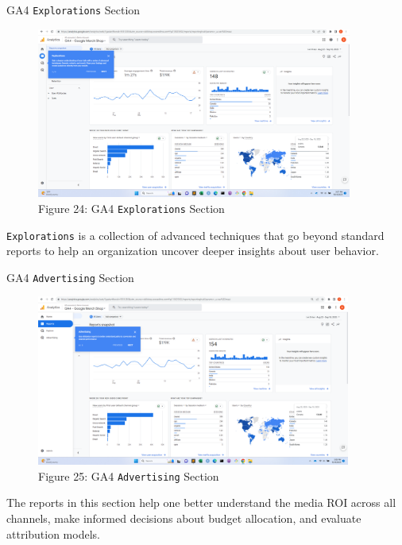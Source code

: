 \documentclass[pdf]{beamer}
\theoremstyle{remark}
\theoremstyle{definition}
\begin{document}
\begin{frame}[t]{GA4 \texttt{Explorations} Section}
\begin{figure}[htbp]
  \captionsetup{justification=centering}
  \includegraphics[height=5.6cm, trim=1.5cm 0.0cm 2.0cm 0.0cm width=5.6cm]{Images/G4A_6d_091923_Explorations.png}
  \caption{Figure {\color{franklinblue} 24}: GA4 \texttt{Explorations} Section}
\end{figure}
\vspace{-2.0ex}
\small 
\texttt{Explorations} is a collection of advanced techniques that go beyond standard reports to help an organization uncover deeper insights about user behavior.
\end{frame}

\begin{frame}[t]{GA4 \texttt{Advertising} Section}
\begin{figure}[htbp]
  \captionsetup{justification=centering}
  \includegraphics[height=5.6cm, trim=1.5cm 0.0cm 2.0cm 0.0cm width=5.6cm]{Images/G4A_6f_091923_Advertising.png}
  \caption{Figure {\color{franklinblue} 25}: GA4 \texttt{Advertising} Section}
\end{figure}
\vspace{-2.0ex}
\small 
The reports in this section help one better understand the media ROI across all channels, make informed decisions about budget allocation, and evaluate attribution models.
\end{frame}
\end{document}
